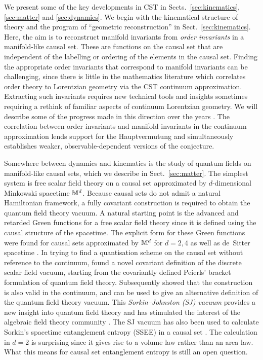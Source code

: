 We present some of the key developments in  CST in Sects.~\ref{sec:kinematics}, \ref{sec:matter} and \ref{sec:dynamics}. We
begin with the kinematical structure of theory and the program of ``geometric reconstruction'' in Sect.~\ref{sec:kinematics}. Here, the aim
is to reconstruct manifold invariants from  \emph{order invariants}  in a manifold-like causal set. These are functions on
the causal set that are independent of the labelling or ordering of the elements in the causal set.    
Finding the appropriate order invariants that correspond to manifold invariants can be challenging, since there is little in the mathematics
literature which correlates  order theory to  Lorentzian geometry via the CST continuum approximation. 
Extracting such invariants requires new technical tools and insights sometimes requiring a rethink of familiar aspects
of continuum Lorentzian geometry. We  will describe some of the progress made in this direction over the years 
\citep{myrheim,bg,meyer,bommeyer,bomthesis,reid,homology,rw,sorkinnonlocal,bd,dionthesis,gaussbonnet,intervals,rss,bdjs,tlbdry,bomemad,esv}. The 
correlation between order invariants and manifold invariants  in the continuum approximation lends support for the
Hauptvermutung and simultaneously establishes weaker, observable-dependent versions of the conjecture.

Somewhere between dynamics and kinematics is the study of quantum fields on
manifold-like causal sets, which we describe in Sect.~\ref{sec:matter}. The simplest system is free
scalar field theory on a causal set approximated by $d$-dimensional Minkowski spacetime $\mathbb M^d$. Because causal sets do not admit a natural Hamiltonian
framework, a fully covariant construction is required to obtain the quantum field theory vacuum. A natural starting
point is the advanced and retarded Green functions
for a free scalar field theory since  it is defined using the causal structure of the spacetime. The explicit form for
these Green functions were found for causal sets approximated by $\mathbb M^d$ for $d=2,4$ 
\citep{daughton,johnston,johnstonthesis} as well as  de~Sitter spacetime \citep{dsx}.  In trying to find a quantisation scheme on the causal
set without reference to the continuum, 
\cite{johnstontwo} found a novel covariant definition of the discrete scalar field vacuum, starting from the covariantly
defined Peierls' bracket formulation of quantum field theory. Subsequently 
\cite{sorkinsj} showed that the construction is also valid in the continuum, and can be used to give an alternative
definition of the quantum field theory vacuum. This  \emph{Sorkin--Johnston (SJ) vacuum} provides a new 
insight into quantum field theory and  has stimulated the interest
of the algebraic field theory community \citep{fv12,bf14,fewsterart}. The SJ vacuum has also been used to calculate Sorkin's spacetime
entanglement entropy (SSEE) \citep{bklsEE,sorkinEE} in a causal set \citep{yasamaneecont,causetee}. The calculation in $d=2$ is 
surprising since it gives rise to a volume law rather than an area law. What this means for causal set entanglement
entropy is still an open question. 

